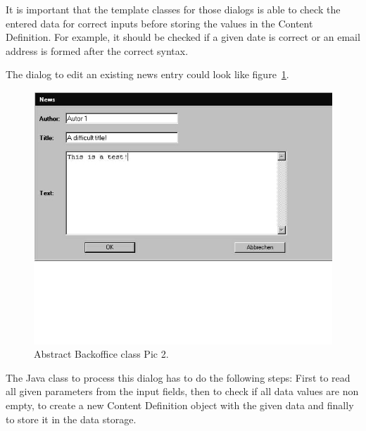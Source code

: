 It is important that the template classes for those dialogs is able to
check the entered data for correct inputs before storing the values in
the Content Definition. For example, it should be checked  if a given
date is correct or an email address is formed after the correct syntax.

The dialog to edit an existing news entry could look like figure~\ref{AbsrtactBO1}.

\begin{figure}
\begin{center}
\includegraphics[clip,width=\sgw]{pics/backOffice/new}
\end{center}
\caption[Abstract Backoffice class Pic 2]{Abstract Backoffice class Pic 2.}
\label{AbsrtactBO1}
\end{figure}

The Java class to process this dialog has to do the following steps:
First to read all given parameters from the input fields, then to check
if all data values are non empty,  to create a new Content Definition
object with the given data and finally to store it in the data storage.






